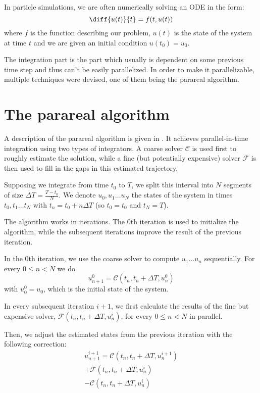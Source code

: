 \documentclass[conference]{IEEEtran}
\begin{document}
In particle simulations, we are often numerically solving an ODE in the form:
$$
\diff{u(t)}{t} = f(t, u(t))
$$
where $f$ is the function describing our problem, $u(t)$ is the state of the system at time $t$ and we are given an initial condition $u(t_0) = u_0$.

The integration part is the part which usually is dependent on some previous time step and thus can't be easily parallelized. In order to make it parallelizable, multiple techniques were devised, one of them being the parareal algorithm.

\section{The parareal algorithm}

A description of the parareal algorithm is given in \cite{parareal}. It achieves parallel-in-time integration using two types of integrators. A coarse solver $\mathcal{C}$ is used first to roughly estimate the solution, while a fine (but potentially expensive) solver $\mathcal{F}$ is then used to fill in the gaps in this estimated trajectory.

Supposing we integrate from time $t_0$ to $T$, we split this interval into $N$ segments of size $\Delta T = \frac{T-t_0}{N}$. We denote $u_0, u_1\dots u_N$ the states of the system in times $t_0, t_1\dots t_N$ with $t_n = t_0 + n\Delta T$ (so $t_0 = t_0$ and $t_N = T$).

The algorithm works in iterations. The 0th iteration is used to initialize the algorithm, while the subsequent iterations improve the result of the previous iteration.

In the 0th iteration, we use the coarse solver to compute $u_1\dots u_n$ sequentially. For every $0 \leq n < N$ we do
$$
u^0_{n+1} = \mathcal{C}(t_n, t_n+\Delta T, u^0_n)
$$
with $u^0_0 = u_0$, which is the initial state of the system.

In every subsequent iteration $i+1$, we first calculate the results of the fine but expensive solver, $\mathcal{F}(t_n, t_n+\Delta T, u^{i}_n)$, for every $0 \leq n < N$ in parallel.

Then, we adjust the estimated states from the previous iteration with the following correction:
\begin{multline}
u^{i+1}_{n+1} = \mathcal{C}(t_n, t_n+\Delta T, u^{i+1}_n)\\ + \mathcal{F}(t_n, t_n+\Delta T, u^i_n)\\ - \mathcal{C}(t_n, t_n+\Delta T, u^{i}_n)
\end{multline}
\end{document}
